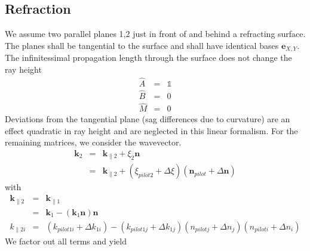 \documentclass[12pt,a4paper,twoside,openright,BCOR10mm,headsepline,titlepage,abstracton,chapterprefix,final]{scrreprt}
\newcommand\Vector[1]{{\mathbf{#1}}}
\newcommand\wavenumber{k}
\newcommand\Wavevector{\Vector{\wavenumber}}
\newcommand\unittensor{\mathds{1}}
\begin{document}
\subsection{Refraction}
We assume two parallel planes 1,2 just in front of and behind a refracting surface.
The planes shall be tangential to the surface 
and shall have identical bases $\Vector{e}_{X,Y}$.
The infinitessimal propagation length through the surface does not change the ray height
\begin{eqnarray}
 \hat{A} &=& \unittensor \\
 \hat{B} &=& 0 \\
 \hat{M} &=& 0
\end{eqnarray}
Deviations from the tangential plane (sag differences due to curvature) 
are an effect quadratic in ray height and are neglected in this linear formalism.
For the remaining matrices, we consider the wavevector.
\begin{eqnarray}
 \Wavevector_2 &=& \Wavevector_{\parallel2} + \xi_2 \Vector{n} \\
               &=& \Wavevector_{\parallel2} + (\xi_{pilot 2} + \Delta \xi) ( \Vector{n}_{pilot} + \Delta \Vector{n})
\end{eqnarray}
with
\begin{eqnarray}
 \Wavevector_{\parallel2} 
 &=& \Wavevector_{\parallel1} 
\\
 &=& \Wavevector_1 - (\Wavevector_1 \Vector{n}) \Vector{n} 
\\
 \wavenumber_{\parallel2i}
 &=& (\wavenumber_{pilot1i} + \Delta \wavenumber_{1i}) - ( \wavenumber_{pilot1j} + \Delta \wavenumber_{1j} )( n_{pilotj} + \Delta n_j )( n_{piloti} + \Delta n_i )
\end{eqnarray}
We factor out all terms and yield
\end{document}
